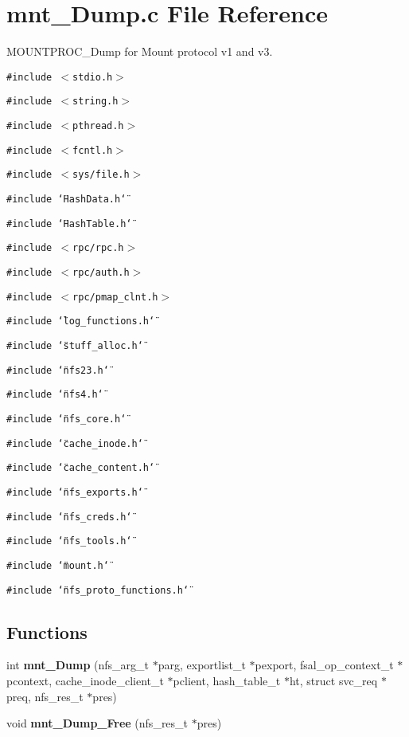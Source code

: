 \section{mnt\_\-Dump.c File Reference}
\label{mnt__Dump_8c}
MOUNTPROC\_\-Dump for Mount protocol v1 and v3. 

{\tt \#include $<$stdio.h$>$}\par
{\tt \#include $<$string.h$>$}\par
{\tt \#include $<$pthread.h$>$}\par
{\tt \#include $<$fcntl.h$>$}\par
{\tt \#include $<$sys/file.h$>$}\par
{\tt \#include \char`\"{}Hash\-Data.h\char`\"{}}\par
{\tt \#include \char`\"{}Hash\-Table.h\char`\"{}}\par
{\tt \#include $<$rpc/rpc.h$>$}\par
{\tt \#include $<$rpc/auth.h$>$}\par
{\tt \#include $<$rpc/pmap\_\-clnt.h$>$}\par
{\tt \#include \char`\"{}log\_\-functions.h\char`\"{}}\par
{\tt \#include \char`\"{}stuff\_\-alloc.h\char`\"{}}\par
{\tt \#include \char`\"{}nfs23.h\char`\"{}}\par
{\tt \#include \char`\"{}nfs4.h\char`\"{}}\par
{\tt \#include \char`\"{}nfs\_\-core.h\char`\"{}}\par
{\tt \#include \char`\"{}cache\_\-inode.h\char`\"{}}\par
{\tt \#include \char`\"{}cache\_\-content.h\char`\"{}}\par
{\tt \#include \char`\"{}nfs\_\-exports.h\char`\"{}}\par
{\tt \#include \char`\"{}nfs\_\-creds.h\char`\"{}}\par
{\tt \#include \char`\"{}nfs\_\-tools.h\char`\"{}}\par
{\tt \#include \char`\"{}mount.h\char`\"{}}\par
{\tt \#include \char`\"{}nfs\_\-proto\_\-functions.h\char`\"{}}\par
\subsection*{Functions}
\begin{CompactItemize}
\item 
int {\bf mnt\_\-Dump} (nfs\_\-arg\_\-t $\ast$parg, exportlist\_\-t $\ast$pexport, fsal\_\-op\_\-context\_\-t $\ast$pcontext, cache\_\-inode\_\-client\_\-t $\ast$pclient, hash\_\-table\_\-t $\ast$ht, struct svc\_\-req $\ast$preq, nfs\_\-res\_\-t $\ast$pres)
\item 
void {\bf mnt\_\-Dump\_\-Free} (nfs\_\-res\_\-t $\ast$pres)
\end{CompactItemize}


